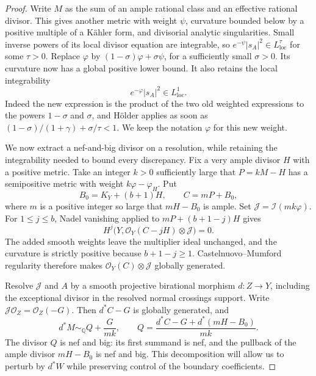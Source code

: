 \begin{proof}
Write $M$ as the sum of an ample rational class and an effective
rational divisor.  This gives another metric with weight $\psi$,
curvature bounded below by a positive multiple of a K\"ahler form,
and divisorial analytic singularities.  Small inverse powers of its
local divisor equation are integrable, so
$e^{-\psi}|s_A|^2\in L^\tau_{\mathrm{loc}}$ for some $\tau>0$.
Replace $\varphi$ by $(1-\sigma)\varphi+\sigma\psi$, for a sufficiently
small $\sigma>0$.  Its curvature now has a global positive lower bound.
It also retains the local integrability
\begin{equation}\label{jet:mixed-l1}
 e^{-\varphi}|s_A|^2\in L^1_{\mathrm{loc}}.
\end{equation}
Indeed the new expression is the product of the two old weighted
expressions to the powers $1-\sigma$ and $\sigma$, and H\"older applies
as soon as
$(1-\sigma)/(1+\gamma)+\sigma/\tau<1$.
We keep the notation $\varphi$ for this new weight.

We now extract a nef-and-big divisor on a resolution, while retaining
the integrability needed to bound every discrepancy.
Fix a very ample divisor $H$ with a positive metric.  Take an integer
$k>0$ sufficiently large that $P=kM-H$ has a semipositive metric with
weight $k\varphi-\varphi_H$.  Put
\[
 B_0=K_Y+(b+1)H,
 \qquad C=mP+B_0,
\]
where $m$ is a positive integer so large that $mH-B_0$ is ample.
Set $\mathcal J=\mathcal I(mk\varphi)$.
For $1\leq j\leq b$, Nadel vanishing applied to
$mP+(b+1-j)H$ gives
\[
 H^j\bigl(Y,\mathcal O_Y(C-jH)\otimes\mathcal J\bigr)=0.
\]
The added smooth weights leave the multiplier ideal unchanged, and
the curvature is strictly positive because $b+1-j\geq1$.
Castelnuovo--Mumford regularity therefore makes
$\mathcal O_Y(C)\otimes\mathcal J$ globally generated.

Resolve $\mathcal J$ and $A$ by a smooth projective birational morphism
$d:Z\to Y$, including the exceptional divisor in the resolved normal
crossings support.  Write
$\mathcal J\mathcal O_Z=\mathcal O_Z(-G)$.
Then $d^*C-G$ is globally generated, and
\begin{equation}\label{jet:nef-big-decomposition}
 d^*M\sim_{\mathbb Q}Q+\frac{G}{mk},\qquad
 Q=\frac{d^*C-G+d^*(mH-B_0)}{mk}.
\end{equation}
The divisor $Q$ is nef and big: its first summand is nef, and the
pullback of the ample divisor $mH-B_0$ is nef and big.
This decomposition will allow us to perturb by $d^*W$ while preserving
control of the boundary coefficients.


\end{proof}
